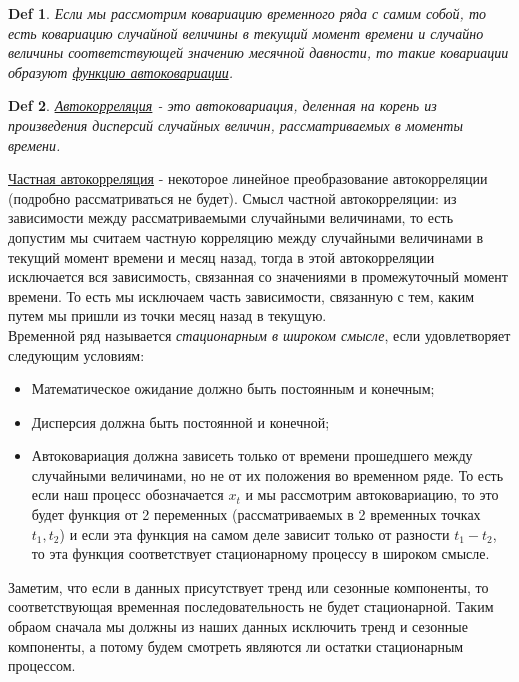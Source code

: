 \documentclass{article}
\newtheorem*{definition}{Def}
\begin{document}
\begin{definition} \label{d5} 
Если мы рассмотрим ковариацию временного ряда с самим собой, то есть ковариацию случайной величины в текущий момент времени и случайно величины соответствующей значению месячной давности, то такие ковариации образуют \underline{функцию автоковариации}.
\end{definition}

\begin{definition} \label{d6} 
\underline{Автокорреляция} - это автоковариация, деленная на корень из произведения дисперсий случайных величин, рассматриваемых в моменты времени. 
\end{definition}



\underline{Частная автокорреляция} - некоторое линейное преобразование автокорреляции (подробно рассматриваться не будет). Смысл частной автокорреляции: из зависимости между рассматриваемыми случайными величинами, то есть допустим мы считаем частную корреляцию между случайными величинами в текущий момент времени и месяц назад, тогда в этой автокорреляции исключается вся зависимость, связанная со значениями в промежуточный момент времени. То есть мы исключаем часть зависимости, связанную с тем, каким путем мы пришли из точки месяц назад в текущую.
\\[2.0ex] 
Временной ряд называется \textit{стационарным в широком смысле}, если удовлетворяет следующим условиям: 
\begin{itemize}
    \item Математическое ожидание должно быть постоянным и конечным;
    \item Дисперсия должна быть постоянной и конечной;
    \item Автоковариация должна зависеть только от времени прошедшего между случайными величинами, но не от их положения во временном ряде. То есть если наш процесс обозначается $x_t$ и мы рассмотрим автоковариацию, то это будет функция от 2 переменных (рассматриваемых в 2 временных точках $t_1, t_2$) и  если эта функция на самом деле зависит только от разности  $t_1 - t_2$, то эта функция соответствует стационарному процессу в широком смысле. 
\end{itemize}

Заметим, что если в данных присутствует тренд или сезонные компоненты, то соответствующая временная последовательность не будет стационарной. Таким обраом сначала мы должны из наших данных исключить тренд и сезонные компоненты, а потому будем смотреть являются ли остатки стационарным процессом.
\end{document}
